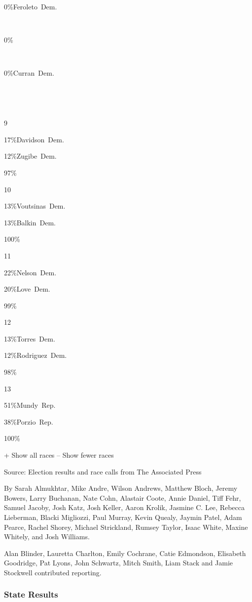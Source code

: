  0\%Feroleto~Dem.

~

0\%

~

 0\%Curran~Dem.

~

~

9

 17\%Davidson~Dem.

 12\%Zugibe~Dem.

97\%

10

 13\%Voutsinas~Dem.

 13\%Balkin~Dem.

100\%

11

 22\%Nelson~Dem.

 20\%Love~Dem.

99\%

12

 13\%Torres~Dem.

 12\%Rodriguez~Dem.

98\%

13

 51\%Mundy~Rep.

 38\%Porzio~Rep.

100\%

+ Show all races -- Show fewer races

Source: Election results and race calls from The Associated Press

By Sarah Almukhtar, Mike Andre, Wilson Andrews, Matthew Bloch, Jeremy
Bowers, Larry Buchanan, Nate Cohn, Alastair Coote, Annie Daniel, Tiff
Fehr, Samuel Jacoby, Josh Katz, Josh Keller, Aaron Krolik, Jasmine C.
Lee, Rebecca Lieberman, Blacki Migliozzi, Paul Murray, Kevin Quealy,
Jaymin Patel, Adam Pearce, Rachel Shorey, Michael Strickland, Rumsey
Taylor, Isaac White, Maxine Whitely, and Josh Williams.

Alan Blinder, Lauretta Charlton, Emily Cochrane, Catie Edmondson,
Elisabeth Goodridge, Pat Lyons, John Schwartz, Mitch Smith, Liam Stack
and Jamie Stockwell contributed reporting.

\hypertarget{state-results}{%
\subsubsection{State Results}\label{state-results}}


